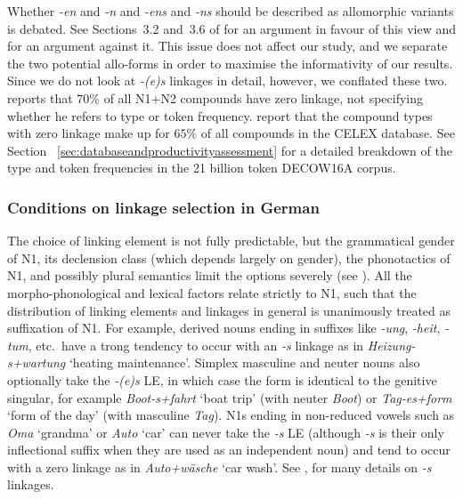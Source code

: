 Whether \textit{-en} and \textit{-n} and \textit{-ens} and \textit{-ns} should be described as allomorphic variants is debated.
See Sections~3.2 and~3.6 of \textcite{NueblingSzczepaniak2013} for an argument in favour of this view and \textcite[33--36]{Neef2015} for an argument against it.
This issue does not affect our study, and we separate the two potential allo-forms in order to maximise the informativity of our results.
Since we do not look at \textit{-(e)s} linkages in detail, however, we conflated these two.
\textcite[177]{Gallmann1998} reports that $70\%$ of all N1+N2 compounds have zero linkage, not specifying whether he refers to type or token frequency.
\textcite[29]{KrottEa2007} report that the compound types with zero linkage make up for $65\%$ of all compounds in the CELEX database.
See Section~ \ref{sec:databaseandproductivityassessment} for a detailed breakdown of the type and token frequencies in the 21 billion token DECOW16A corpus.


\subsubsection{Conditions on linkage selection in German}

The choice of linking element is not fully predictable, but the grammatical gender of N1, its declension class (which depends largely on gender), the phonotactics of N1, and possibly plural semantics limit the options severely (see \citealt{Fuhrhop1996,NueblingSzczepaniak2013}).
All the morpho-phonological and lexical factors relate strictly to N1, such that the distribution of linking elements and linkages in general is unanimously treated as suffixation of N1.
For example, derived nouns ending in suffixes like \textit{-ung}, \textit{-heit}, \textit{-tum}, etc.\ have a trong tendency to occur with an \textit{-s} linkage as in \textit{Heizung-s+wartung} `heating maintenance'.
Simplex masculine and neuter nouns also optionally take the \textit{-(e)s} LE, in which case the form is identical to the genitive singular, for example \textit{Boot-s+fahrt} `boat trip' (with neuter \textit{Boot}) or \textit{Tag-es+form} `form of the day' (with masculine \textit{Tag}).
N1s ending in non-reduced vowels such as \textit{Oma} `grandma' or \textit{Auto} `car' can never take the \textit{-s} LE (although \textit{-s} is their only inflectional suffix when they are used as an independent noun) and tend to occur with a zero linkage as in \textit{Auto+wäsche} `car wash'.
See \textcite{Wegener2003}, \textcite{FuhrhopKuerschner2015} for many details on \textit{-s} linkages.

